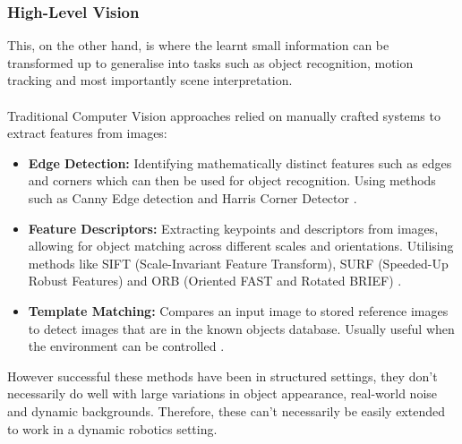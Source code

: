   \subsubsection{High-Level Vision}
    This, on the other hand, is where the learnt small information can be transformed up to generalise into tasks such as object recognition, motion tracking and most importantly scene interpretation.
    \\\\
    Traditional Computer Vision approaches relied on manually crafted systems to extract features from images:
    \begin{itemize}
      \item \textbf{Edge Detection:} Identifying mathematically distinct features such as edges and corners \cite{marr1980theory} which can then be used for object recognition. Using methods such as Canny Edge detection \cite{canny1986computational} and Harris Corner Detector \cite{derpanis2004harris}.
      \item \textbf{Feature Descriptors:} Extracting keypoints and descriptors from images, allowing for object matching across different scales and orientations. Utilising methods like SIFT (Scale-Invariant Feature Transform), SURF (Speeded-Up Robust Features) \cite{wu2013comparative,juan2009comparison} and ORB (Oriented FAST and Rotated BRIEF) \cite{rublee2011orb}.
      \item \textbf{Template Matching:} Compares an input image to stored reference images to detect images that are in the known objects database. Usually useful when the environment can be controlled \cite{brunelli2009template}.
    \end{itemize}

    However successful these methods have been in structured settings, they don't necessarily do well with large variations in object appearance, real-world noise and dynamic backgrounds. Therefore, these can't necessarily be easily extended to work in a dynamic robotics setting.

